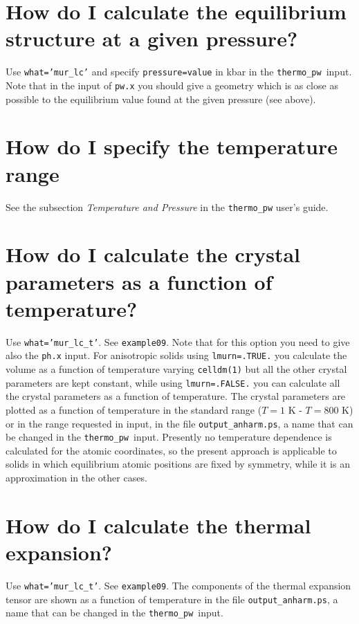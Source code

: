 \documentclass[12pt,a4paper]{article}
\def\thermo{\texttt{thermo\_pw}}
\begin{document}
\newpage
\section{\color{coral}How do I calculate the equilibrium structure 
at a given pressure?}
Use \texttt{what='mur\_lc'} and specify \texttt{pressure=value} in kbar in the
\thermo\ input. Note that in the input of \texttt{pw.x} you should 
give a geometry which is as close as possible to the equilibrium value
found at the given pressure (see above).

\newpage
\section{\color{coral}How do I specify the temperature range} 
See the subsection {\it Temperature and Pressure} in the 
\texttt{thermo\_pw} user's guide. 

\newpage
\section{\color{coral}How do I calculate the crystal parameters as a function
of temperature?}
Use \texttt{what='mur\_lc\_t'}. See \texttt{example09}. Note that
for this option you need to give also the \texttt{ph.x} input.
For anisotropic solids using \texttt{lmurn=.TRUE.} you calculate 
the volume as a function of temperature varying \texttt{celldm(1)} 
but all the other crystal parameters are kept constant, while
using \texttt{lmurn=.FALSE.} you can calculate all the crystal
parameters as a function of temperature.
The crystal parameters are plotted as a function of temperature
in the standard range ($T=1$ K - $T=800$ K) or in the range  
requested in input, in the file 
\texttt{output\_anharm.ps}, a name that can be changed in the \thermo\ input.
Presently no temperature dependence is calculated 
for the atomic coordinates, so the present approach is applicable
to solids in which equilibrium atomic positions are fixed by 
symmetry, while it is an approximation in the other cases.

\newpage
\section{\color{coral}How do I calculate the thermal expansion?}
Use \texttt{what='mur\_lc\_t'}. See \texttt{example09}. The components
of the thermal expansion tensor are shown as a function of temperature 
in the file \texttt{output\_anharm.ps}, a name that can be changed in 
the \thermo\ input.
\end{document}
